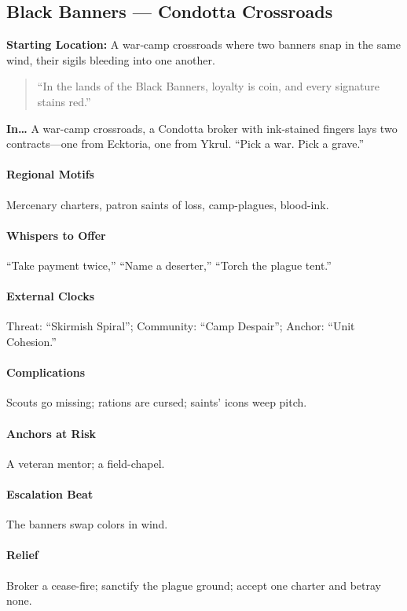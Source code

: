 \subsection*{Black Banners — Condotta Crossroads}
\textbf{Starting Location:} A war‑camp crossroads where two banners snap in the same wind, their sigils bleeding into one another.
\begin{quote}
“In the lands of the Black Banners, loyalty is coin, and every signature stains red.”
\end{quote}

\textbf{In…} A war-camp crossroads, a Condotta broker with ink-stained fingers lays two contracts—one from Ecktoria, one from Ykrul. ``Pick a war. Pick a grave.''
\paragraph{Regional Motifs} Mercenary charters, patron saints of loss, camp-plagues, blood-ink.
\paragraph{Whispers to Offer} ``Take payment twice,'' ``Name a deserter,'' ``Torch the plague tent.''
\paragraph{External Clocks} Threat: ``Skirmish Spiral''; Community: ``Camp Despair''; Anchor: ``Unit Cohesion.''
\paragraph{Complications} Scouts go missing; rations are cursed; saints’ icons weep pitch.
\paragraph{Anchors at Risk} A veteran mentor; a field-chapel.
\paragraph{Escalation Beat} The banners swap colors in wind.
\paragraph{Relief} Broker a cease-fire; sanctify the plague ground; accept one charter and betray none.
